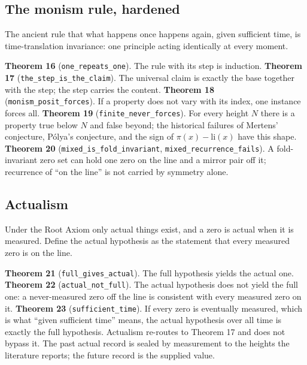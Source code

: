 \documentclass[10pt,twocolumn]{article}
\begin{document}
\hypertarget{the-monism-rule-hardened}{%
\subsection{The monism rule, hardened}\label{the-monism-rule-hardened}}

The ancient rule that what happens once happens again, given sufficient
time, is time-translation invariance: one principle acting identically
at every moment.

\textbf{Theorem 16} (\texttt{one\_repeats\_one}). The rule with its step
is induction. \textbf{Theorem 17} (\texttt{the\_step\_is\_the\_claim}).
The universal claim is exactly the base together with the step; the step
carries the content. \textbf{Theorem 18}
(\texttt{monism\_posit\_forces}). If a property does not vary with its
index, one instance forces all. \textbf{Theorem 19}
(\texttt{finite\_never\_forces}). For every height \(N\) there is a
property true below \(N\) and false beyond; the historical failures of
Mertens' conjecture, Pólya's conjecture, and the sign of
\(\pi(x) - \mathrm{li}(x)\) have this shape. \textbf{Theorem 20}
(\texttt{mixed\_is\_fold\_invariant},
\texttt{mixed\_recurrence\_fails}). A fold-invariant zero set can hold
one zero on the line and a mirror pair off it; recurrence of ``on the
line'' is not carried by symmetry alone.

\hypertarget{actualism}{%
\subsection{Actualism}\label{actualism}}

Under the Root Axiom only actual things exist, and a zero is actual when
it is measured. Define the actual hypothesis as the statement that every
measured zero is on the line.

\textbf{Theorem 21} (\texttt{full\_gives\_actual}). The full hypothesis
yields the actual one. \textbf{Theorem 22} (\texttt{actual\_not\_full}).
The actual hypothesis does not yield the full one: a never-measured zero
off the line is consistent with every measured zero on it.
\textbf{Theorem 23} (\texttt{sufficient\_time}). If every zero is
eventually measured, which is what ``given sufficient time'' means, the
actual hypothesis over all time is exactly the full hypothesis.
Actualism re-routes to Theorem 17 and does not bypass it. The past
actual record is sealed by measurement to the heights the literature
reports; the future record is the supplied value.
\end{document}
